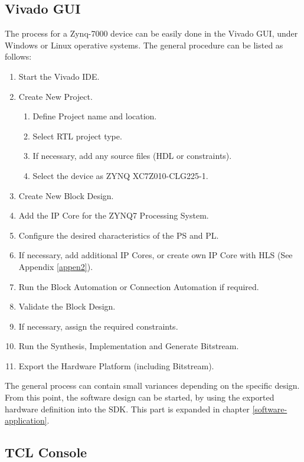 \subsection{Vivado GUI}

The process for a Zynq-7000 device can be easily done in the Vivado GUI, under Windows or Linux operative systems. The general procedure can be listed as follows:

\begin{enumerate}
	\item Start the Vivado IDE.
	\item Create New Project.
	\begin{enumerate}
		\item Define Project name and location.
		\item Select RTL project type.
		\item If necessary, add any source files (HDL or constraints).
		\item Select the device as ZYNQ XC7Z010-CLG225-1.
	\end{enumerate}
	\item Create New Block Design.
	\item Add the IP Core for the ZYNQ7 Processing System.
	\item Configure the desired characteristics of the PS and PL.
	\item If necessary, add additional IP Cores, or create own IP Core with HLS (See Appendix \ref{appen2}).
	\item Run the Block Automation or Connection Automation if required.
	\item Validate the Block Design.
	\item If necessary, assign the required constraints.
	\item Run the Synthesis, Implementation and Generate Bitstream.
	\item Export the Hardware Platform (including Bitstream).
\end{enumerate}

The general process can contain small variances depending on the specific design. From this point, the software design can be started, by using the exported hardware definition into the SDK. This part is expanded in chapter \ref{software-application}.

\subsection{TCL Console}


